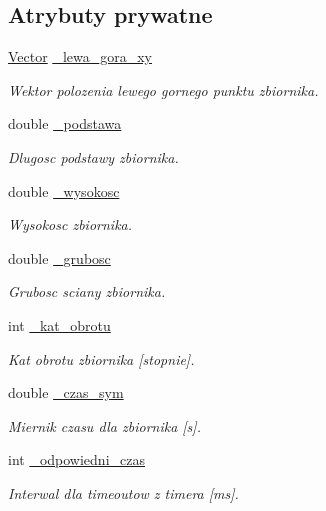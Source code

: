 \subsection*{Atrybuty prywatne}
\begin{DoxyCompactItemize}
\item 
\hyperlink{class_vector}{Vector} \hyperlink{class_zbiornik_aab83049b3afbd20e1f158daf16e17e87}{\+\_\+lewa\+\_\+gora\+\_\+xy}
\begin{DoxyCompactList}\small\item\em Wektor polozenia lewego gornego punktu zbiornika. \end{DoxyCompactList}\item 
double \hyperlink{class_zbiornik_aff57d3fb370566986df4eb58711cbfae}{\+\_\+podstawa}
\begin{DoxyCompactList}\small\item\em Dlugosc podstawy zbiornika. \end{DoxyCompactList}\item 
double \hyperlink{class_zbiornik_abe4d7a4e2d39e802d656b03bb3afdd3f}{\+\_\+wysokosc}
\begin{DoxyCompactList}\small\item\em Wysokosc zbiornika. \end{DoxyCompactList}\item 
double \hyperlink{class_zbiornik_a8a1db6d1edbfaa1a4f84d9717a8c0dfc}{\+\_\+grubosc}
\begin{DoxyCompactList}\small\item\em Grubosc sciany zbiornika. \end{DoxyCompactList}\item 
int \hyperlink{class_zbiornik_a0ec6f5babd42c79bf3f1e7055e8d413e}{\+\_\+kat\+\_\+obrotu}
\begin{DoxyCompactList}\small\item\em Kat obrotu zbiornika \mbox{[}stopnie\mbox{]}. \end{DoxyCompactList}\item 
double \hyperlink{class_zbiornik_a4a30db357e7e7b3ed28acb59db5a86ad}{\+\_\+czas\+\_\+sym}
\begin{DoxyCompactList}\small\item\em Miernik czasu dla zbiornika \mbox{[}s\mbox{]}. \end{DoxyCompactList}\item 
int \hyperlink{class_zbiornik_a14cf0ec861fc38fe40081342ef1e00df}{\+\_\+odpowiedni\+\_\+czas}
\begin{DoxyCompactList}\small\item\em Interwal dla timeout\textquotesingle{}ow z timera \mbox{[}ms\mbox{]}. \end{DoxyCompactList}\end{DoxyCompactItemize}


